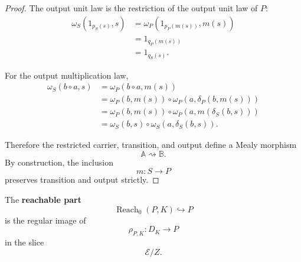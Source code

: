 \begin{proof}
    The output unit law is the restriction of the output unit law of \(P\):
    \[
        \begin{aligned}
            \omega_S(1_{p_S(s)},s)
            &=
            \omega_P(1_{p_P(m(s))},m(s))
            \\
            &=
            1_{q_P(m(s))}
            \\
            &=
            1_{q_S(s)}.
        \end{aligned}
    \]

    For the output multiplication law,
    \[
        \begin{aligned}
            \omega_S(b\circ a,s)
            &=
            \omega_P(b\circ a,m(s))
            \\
            &=
            \omega_P(b,m(s))
            \circ
            \omega_P(a,\delta_P(b,m(s)))
            \\
            &=
            \omega_P(b,m(s))
            \circ
            \omega_P(a,m(\delta_S(b,s)))
            \\
            &=
            \omega_S(b,s)
            \circ
            \omega_S(a,\delta_S(b,s)).
        \end{aligned}
    \]

    Therefore the restricted carrier, transition, and output define a
    Mealy morphism
    \[
        \mathbb A\rightsquigarrow\mathbb B.
    \]
    By construction, the inclusion
    \[
        m:S\to P
    \]
    preserves transition and output strictly.
\end{proof}

\begin{definition}
\label{def:reachable-part}
    The \textbf{reachable part}
    \[
        \operatorname{Reach}_0(P,K)\hookrightarrow P
    \]
    is the regular image of
    \[
        \rho_{P,K}:D_K\to P
    \]
    in the slice
    \[
        \mathcal E/Z.
    \]
\end{definition}

